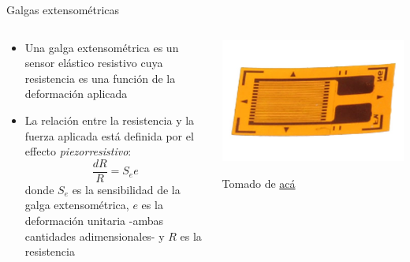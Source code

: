 \documentclass[aspectratio=169]{beamer}
\begin{document}
\begin{frame}{Galgas extensométricas}
    \begin{columns}[c, onlytextwidth]
        \begin{column}{0.6\textwidth}
            \begin{itemize}
                \item Una galga extensométrica es un sensor elástico resistivo cuya resistencia es una función de la deformación aplicada
                \item La relación entre la resistencia y la fuerza aplicada está definida por el effecto \emph{piezorresistivo}:
                \begin{equation*}
                    \dfrac{dR}{R} = S_e e
                \end{equation*}
                donde $S_e$ es la sensibilidad de la galga extensométrica, $e$ es la deformación unitaria -ambas cantidades adimensionales- y $R$ es la resistencia
            \end{itemize}
        \end{column}
        \begin{column}{0.40\textwidth}
            \includegraphics[width = 1\linewidth]{fig/Fuerza_Vibracion/straingauge.jpg}

            \tiny{Tomado de \href{https://www.partco.fi/16584-thickbox_default/venymaliuskaanturi350ohm.jpg}{acá}}
        \end{column}
    \end{columns}
\end{frame}
\end{document}
